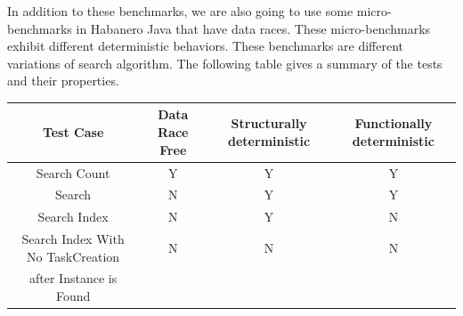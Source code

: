 In addition to these benchmarks, we are also going to use some micro-benchmarks in Habanero Java that have data races. These 
micro-benchmarks exhibit different deterministic behaviors. These benchmarks are different variations of search algorithm. The following table gives a summary of the tests and their properties. \\

\begin{tabular}{ | c | c | c | c |}
  \hline
  \textbf{Test Case} & \textbf{Data Race Free} & \textbf{Structurally deterministic} & \textbf{Functionally deterministic} \\
  \hline
  Search Count & Y & Y & Y \\
  \hline
  Search & N & Y & Y \\
  \hline
  Search Index & N & Y & N\\
  \hline 
  Search Index With No TaskCreation & N & N & N\\
   after Instance is Found  & & & \\
  \hline 
\end{tabular}